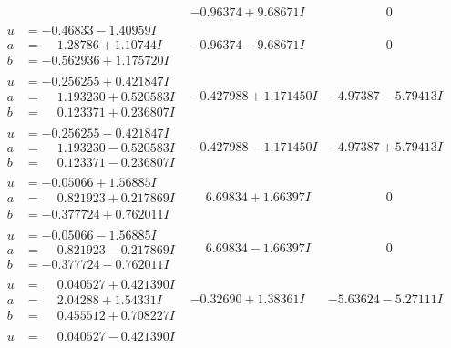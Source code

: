 \documentclass[1p]{elsarticle_modified}
\theoremstyle{definition}
\begin{document}
$$\begin{array}{c|c|c}
 & -0.96374 + 9.68671 I & \phantom{-0.000000 } 0 \\ \hline\begin{aligned}
u &= -0.46833 - 1.40959 I \\
a &= \phantom{-}1.28786 + 1.10744 I \\
b &= -0.562936 + 1.175720 I\end{aligned}
 & -0.96374 - 9.68671 I & \phantom{-0.000000 } 0 \\ \hline\begin{aligned}
u &= -0.256255 + 0.421847 I \\
a &= \phantom{-}1.193230 + 0.520583 I \\
b &= \phantom{-}0.123371 + 0.236807 I\end{aligned}
 & -0.427988 + 1.171450 I & -4.97387 - 5.79413 I \\ \hline\begin{aligned}
u &= -0.256255 - 0.421847 I \\
a &= \phantom{-}1.193230 - 0.520583 I \\
b &= \phantom{-}0.123371 - 0.236807 I\end{aligned}
 & -0.427988 - 1.171450 I & -4.97387 + 5.79413 I \\ \hline\begin{aligned}
u &= -0.05066 + 1.56885 I \\
a &= \phantom{-}0.821923 + 0.217869 I \\
b &= -0.377724 + 0.762011 I\end{aligned}
 & \phantom{-}6.69834 + 1.66397 I & \phantom{-0.000000 } 0 \\ \hline\begin{aligned}
u &= -0.05066 - 1.56885 I \\
a &= \phantom{-}0.821923 - 0.217869 I \\
b &= -0.377724 - 0.762011 I\end{aligned}
 & \phantom{-}6.69834 - 1.66397 I & \phantom{-0.000000 } 0 \\ \hline\begin{aligned}
u &= \phantom{-}0.040527 + 0.421390 I \\
a &= \phantom{-}2.04288 + 1.54331 I \\
b &= \phantom{-}0.455512 + 0.708227 I\end{aligned}
 & -0.32690 + 1.38361 I & -5.63624 - 5.27111 I \\ \hline\begin{aligned}
u &= \phantom{-}0.040527 - 0.421390 I \\

\end{aligned}
\end{array}$$
\end{document}

